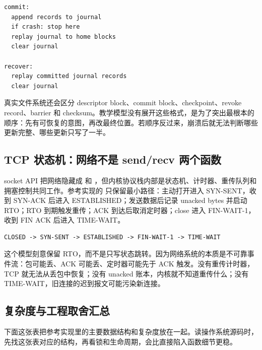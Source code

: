 \begin{lstlisting}
commit:
  append records to journal
  if crash: stop here
  replay journal to home blocks
  clear journal

recover:
  replay committed journal records
  clear journal
\end{lstlisting}

真实文件系统还会区分 descriptor block、commit block、checkpoint、revoke record、barrier 和 checksum。教学模型没有展开这些格式，是为了突出最根本的顺序：先有可恢复的意图，再改最终位置。若顺序反过来，崩溃后就无法判断哪些更新完整、哪些更新只写了一半。

\subsection{TCP 状态机：网络不是 send/recv 两个函数}

socket API 把网络隐藏成  和 ，但内核协议栈内部是状态机、计时器、重传队列和拥塞控制共同工作。参考实现的  只保留最小路径：主动打开进入 SYN-SENT，收到 SYN-ACK 后进入 ESTABLISHED；发送数据后记录 unacked bytes 并启动 RTO；RTO 到期触发重传；ACK 到达后取消定时器；close 进入 FIN-WAIT-1，收到 FIN ACK 后进入 TIME-WAIT。

\begin{lstlisting}
CLOSED -> SYN-SENT -> ESTABLISHED -> FIN-WAIT-1 -> TIME-WAIT
\end{lstlisting}

这个模型刻意保留 RTO，而不是只写状态跳转。因为网络系统的本质是不可靠事件流：包可能丢、ACK 可能丢、定时器可能先于 ACK 触发。没有重传计时器，TCP 就无法从丢包中恢复；没有 unacked 账本，内核就不知道重传什么；没有 TIME-WAIT，旧连接的迟到报文可能污染新连接。

\subsection{复杂度与工程取舍汇总}

下面这张表把参考实现里的主要数据结构和复杂度放在一起。读操作系统源码时，先找这张表对应的结构，再看锁和生命周期，会比直接陷入函数细节更稳。

